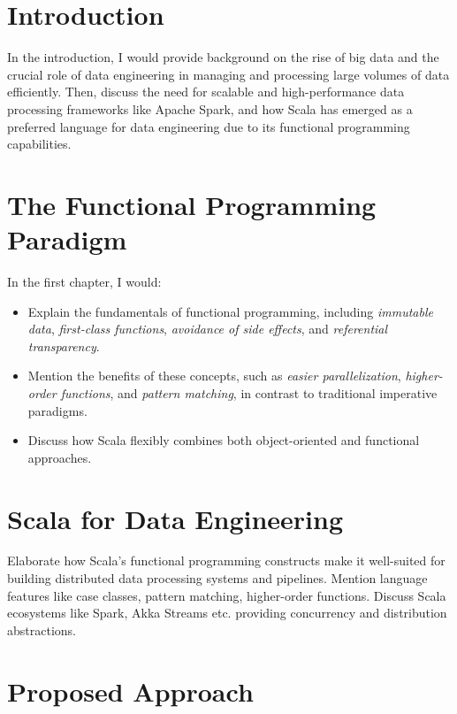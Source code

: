 \tableofcontents

\chapter*{Introduction}

In the introduction, I would provide background on the rise of big data and the crucial role of data engineering in managing and processing large volumes of data efficiently. Then, discuss the need for scalable and high-performance data processing frameworks like Apache Spark, and how Scala has emerged as a preferred language for data engineering due to its functional programming capabilities.

\chapter{The Functional Programming Paradigm}

In the first chapter, I would:

\begin{itemize}
\item Explain the fundamentals of functional programming, including \emph{immutable data}, \emph{first-class functions}, \emph{avoidance of side effects}, and \emph{referential transparency}. 
\item Mention the benefits of these concepts, such as \emph{easier parallelization}, \emph{higher-order functions}, and \emph{pattern matching}, in contrast to traditional imperative paradigms.
\item Discuss how Scala flexibly combines both object-oriented and functional approaches.
\end{itemize}

\chapter{Scala for Data Engineering}

Elaborate how Scala's functional programming constructs make it well-suited for building distributed data processing systems and pipelines. Mention language features like case classes, pattern matching, higher-order functions. Discuss Scala ecosystems like Spark, Akka Streams etc. providing concurrency and distribution abstractions. 

\chapter{Proposed Approach}

